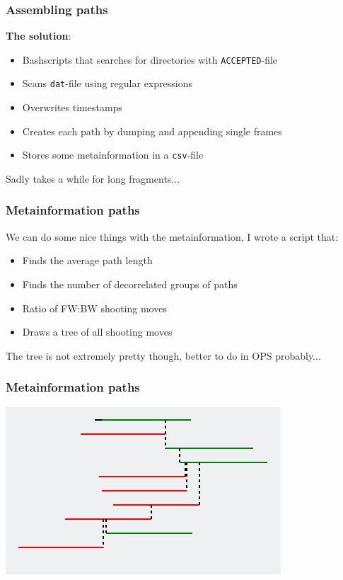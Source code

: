 \documentclass[hyperref={pdfpagelabels=false}]{beamer}
\begin{document}
\begin{frame}
\frametitle{Assembling paths}
\textbf{The solution}: 
\begin{itemize}
\item Bashscripts that searches for directories with \texttt{ACCEPTED}-file
\item Scans \texttt{dat}-file using regular expressions
\item Overwrites timestamps
\item Creates each path by dumping and appending single frames
\item Stores some metainformation in a \texttt{csv}-file
\end{itemize}
Sadly takes a while for long fragments...
\end{frame}

\begin{frame}
\frametitle{Metainformation paths} 
We can do some nice things with the metainformation, I wrote a script that:
\begin{itemize}
\item Finds the average path length
\item Finds the number of decorrelated groups of paths
\item Ratio of FW:BW shooting moves
\item Draws a tree of all shooting moves
\end{itemize}
The tree is not extremely pretty though, better to do in OPS probably...
\end{frame}

\begin{frame}
\frametitle{Metainformation paths} 
\begin{center}
\includegraphics[scale=1]{images/tree.png}
\end{center}
\end{frame}
\end{document}
